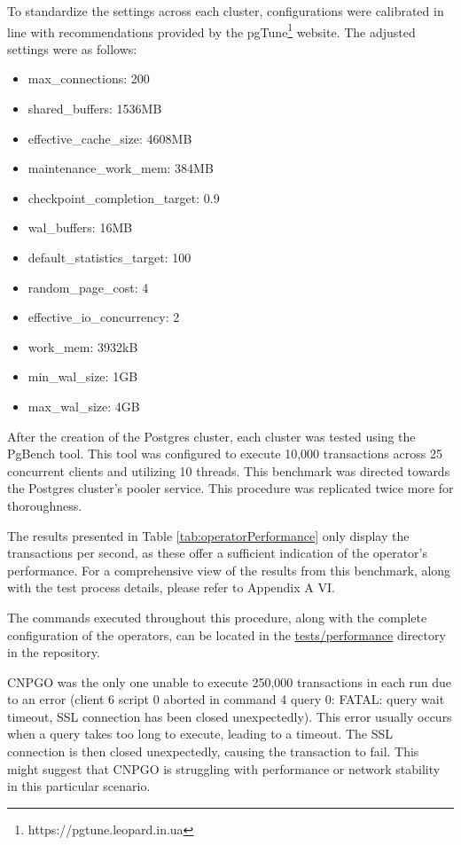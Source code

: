 To standardize the settings across each cluster, configurations were calibrated in line with recommendations provided by the pgTune\footnote[7]{https://pgtune.leopard.in.ua} website. The adjusted settings were as follows:
\begin{itemize}
    \item max\_connections: 200
    \item shared\_buffers: 1536MB
    \item effective\_cache\_size: 4608MB
    \item maintenance\_work\_mem: 384MB
    \item checkpoint\_completion\_target: 0.9
    \item wal\_buffers: 16MB
    \item default\_statistics\_target: 100
    \item random\_page\_cost: 4
    \item effective\_io\_concurrency: 2
    \item work\_mem: 3932kB
    \item min\_wal\_size: 1GB
    \item max\_wal\_size: 4GB
\end{itemize}

After the creation of the Postgres cluster, each cluster was tested using the PgBench tool. This tool was configured to execute 10,000 transactions across 25 concurrent clients and utilizing 10 threads. This benchmark was directed towards the Postgres cluster's pooler service. This procedure was replicated twice more for thoroughness.

The results presented in Table \ref{tab:operatorPerformance} only display the transactions per second, as these offer a sufficient indication of the operator's performance. For a comprehensive view of the results from this benchmark, along with the test process details, please refer to Appendix A VI.

The commands executed throughout this procedure, along with the complete configuration of the operators, can be located in the \url{tests/performance} directory in the repository.

CNPGO was the only one unable to execute 250,000 transactions in each run due to an error (client 6 script 0 aborted in command 4 query 0: FATAL: query wait timeout, SSL connection has been closed unexpectedly).
This error usually occurs when a query takes too long to execute, leading to a timeout. The SSL connection is then closed unexpectedly, causing the transaction to fail. This might suggest that CNPGO is struggling with performance or network stability in this particular scenario.

